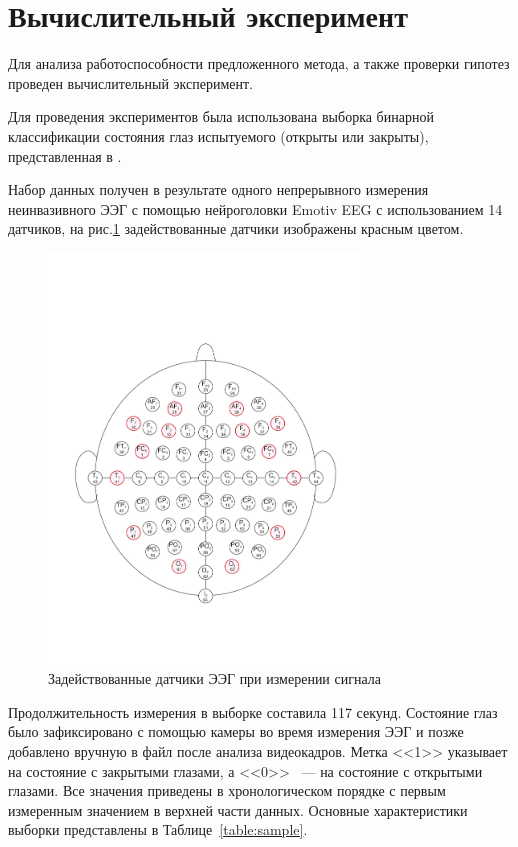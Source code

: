 \documentclass[a4paper, 12pt]{extarticle}
\begin{document}
\section{Вычислительный эксперимент}

Для анализа работоспособности предложенного метода, а также проверки гипотез
проведен вычислительный эксперимент.

Для проведения экспериментов была использована выборка бинарной классификации состояния глаз 
испытуемого (открыты или закрыты), представленная в \citep{misc_eeg_eye_state_264}.

Набор данных получен в результате одного непрерывного измерения неинвазивного ЭЭГ с 
помощью нейроголовки Emotiv EEG с использованием 14 датчиков, на рис.\ref{fig:1} задействованные датчики
изображены красным цветом. 
\begin{figure}[h]
	\centering
	\includegraphics[width=0.75\textwidth]{64_channel_sharbrough.pdf}
	\caption{Задействованные датчики ЭЭГ при измерении сигнала}
	\label{fig:1}
\end{figure}


Продолжительность измерения в выборке составила 117 секунд. 
Состояние глаз было зафиксировано с помощью камеры во время измерения ЭЭГ и позже добавлено 
вручную в файл после анализа видеокадров. Метка <<1>> указывает на состояние с закрытыми глазами, а 
<<0>> ~--- на состояние с открытыми глазами. Все значения приведены в хронологическом порядке с 
первым измеренным значением в верхней части данных.
Основные характеристики выборки представлены в
Таблице~\ref{table:sample}.
\end{document}
